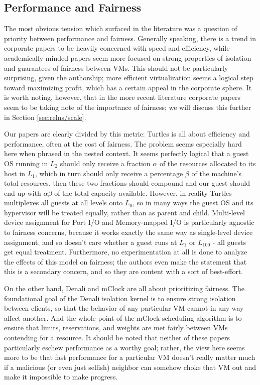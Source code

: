 \documentclass[letterpaper, twocolumn]{article}
\begin{document}
\subsection{Performance and Fairness}
\label{sec:relns/perf-fair}

The most obvious tension which surfaced in the literature was a question
of priority between performance and fairness.  Generally speaking, there is a trend
in corporate papers to be heavily concerned with speed and efficiency, while
academically-minded papers seem more focused on strong properties of isolation
and guarantees of fairness between VMs.  This should not be particularly surprising,
given the authorship; more efficient virtualization seems a logical step toward maximizing
profit, which has a certain appeal in the corporate sphere.  It is worth noting, however,
that in the more recent literature corporate papers seem to be taking note of the
importance of fairness; we will discuss this further in Section \ref{sec:relns/scale}.

Our papers are clearly divided by this metric:  Turtles is all about efficiency
and performance, often at the cost of fairness.  The problem seems
especially hard here when phrased in the nested context.  It seems perfectly logical that
a guest OS running in $L_2$ should only receive a fraction $\alpha$ of the resources allocated
to its host in $L_1$, which in turn should only receive a percentage $\beta$ of the machine's
total resources, then these two fractions should compound and our guest should end up with
$\alpha\beta$ of the total capacity available.  However, in reality Turtles multiplexes
all guests at all levels onto $L_0$, so in many ways the guest OS and its hypervisor will
be treated equally, rather than as parent and child.  Multi-level device assignment
for Port I/O and Memory-mapped I/O is particularly agnostic to fairness concerns, because
it works exactly the same way as single-level device assignment, and so doesn't care whether
a guest runs at $L_1$ or $L_{100}$ - all guests get equal treatment.  Furthermore, no
experimentation at all is done to analyze the effects of this model on fairness;
the authors even make the statement that this is a secondary concern,
and so they are content with a sort of best-effort.

On the other hand, Denali and mClock are all about prioritizing fairness.  The foundational
goal of the Denali isolation kernel is to ensure strong isolation between clients, so that
the behavior of any particular VM cannot in any way affect another.  And the whole point of
the mClock scheduling algorithm is to ensure that limits, reservations, and weights
are met fairly between VMs contending for a resource.  It should be noted that neither
of these papers particularly eschew performance as a worthy goal; rather, the view
here seems more to be that fast performance for a particular VM doesn't really
matter much if a malicious (or even just selfish) neighbor can somehow choke that VM
out and make it impossible to make progress.
\end{document}
